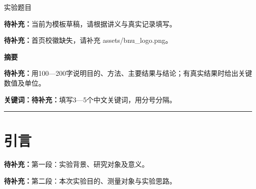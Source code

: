 \documentclass[UTF8,a4paper,11pt,fontset=fandol,scheme=plain]{ctexart}
\title{\ReportTitle}
\author{作者：\ReportBlank{2.4cm}\quad 学号：\ReportBlank{3.0cm}\\
        指导老师：\ReportBlank{2.0cm}\quad 实验时间：\ReportBlank{2.6cm}}
\date{}
\makeatletter
\newcommand{\ReportTitle}{实验题目}
\newcommand{\ReportTODO}[1]{\textbf{待补充：}#1}
\newif\ifReportLogo
\newcommand{\ReportInfo}{\@author}
\makeatother
\begin{document}
\vspace*{12mm}
\begin{center}{\heiti\fontsize{25pt}{31pt}\selectfont\ReportTitle\par}\vspace{5mm}{\ReportInfo\par}\end{center}
\noindent\ReportTODO{当前为模板草稿，请根据讲义与真实记录填写。}
\ifReportLogo\else
  \par\noindent\ReportTODO{首页校徽缺失，请补充 assets/bnu_logo.png。}
\fi


\begingroup\setlength{\fboxsep}{9pt}\noindent\colorbox{ReportTint}{\parbox{\dimexpr\linewidth-2\fboxsep\relax}{
\noindent\textbf{摘要}\par
\ReportTODO{用100—200字说明目的、方法、主要结果与结论；有真实结果时给出关键数值及单位。}
\par\noindent\textbf{关键词：}\ReportTODO{填写3—5个中文关键词，用分号分隔。}
}}\par\endgroup\vspace{8pt}
{\color{ReportAccent}\hrule height 1.2pt}\vspace{8pt}

\section{引言}\label{sec:introduction}
\ReportTODO{第一段：实验背景、研究对象及意义。}

\ReportTODO{第二段：本次实验目的、测量对象与实验思路。}
\end{document}
